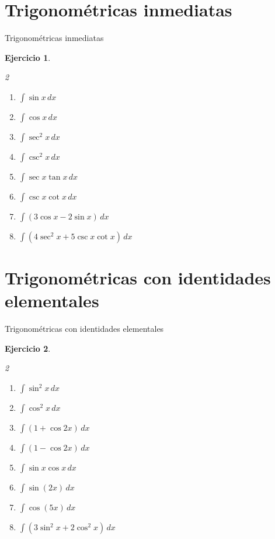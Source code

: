 \documentclass[10pt,aspectratio=169]{beamer}
\newtheorem{Ejer}{Ejercicio}
\begin{document}
\section{Trigonométricas inmediatas}
\begin{frame}{Trigonométricas inmediatas}
\begin{Ejer}
\begin{multicols}{2}
\begin{enumerate}
\item $\displaystyle \int\sin x\,dx$
\item $\displaystyle \int\cos x\,dx$
\item $\displaystyle \int\sec^2x\,dx$
\item $\displaystyle \int\csc^2x\,dx$
\item $\displaystyle \int\sec x\tan x\,dx$
\item $\displaystyle \int\csc x\cot x\,dx$
\item $\displaystyle \int(3\cos x-2\sin x)\,dx$
\item $\displaystyle \int(4\sec^2x+5\csc x\cot x)\,dx$
\end{enumerate}
\end{multicols}
\end{Ejer}
\end{frame}

\section{Trigonométricas con identidades elementales}
\begin{frame}{Trigonométricas con identidades elementales}
\begin{Ejer}
\begin{multicols}{2}
\begin{enumerate}
\item $\displaystyle \int\sin^2x\,dx$
\item $\displaystyle \int\cos^2x\,dx$
\item $\displaystyle \int(1+\cos 2x)\,dx$
\item $\displaystyle \int(1-\cos 2x)\,dx$
\item $\displaystyle \int\sin x\cos x\,dx$
\item $\displaystyle \int\sin(2x)\,dx$
\item $\displaystyle \int\cos(5x)\,dx$
\item $\displaystyle \int(3\sin^2x+2\cos^2x)\,dx$
\end{enumerate}
\end{multicols}
\end{Ejer}

\end{frame}
\end{document}
